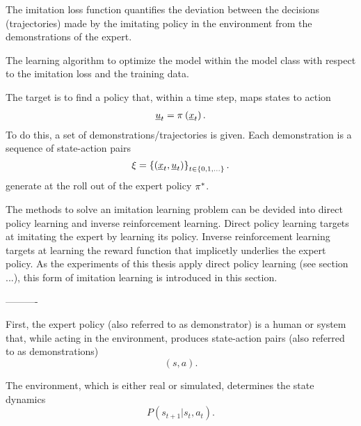 The imitation loss function quantifies 
the deviation between the decisions (trajectories)
made by the imitating policy in the environment
from the demonstrations of the expert.

The learning algorithm to optimize the 
model within the model class with respect to
the imitation loss and the training data.



The target is to find a policy that, within a time step,
maps states to action
\begin{align}
    \underline{u}_{t} = \pi^{}_{} \left({ 
        \underline{x}_{t} 
    }\right).
\end{align}
To do this, a set of demonstrations/trajectories is given.
Each demonstration is a sequence of state-action pairs
\begin{equation}
    \xi = \left\{{
        \left({\underline{x}_{t},\underline{u}_{t}}\right)
    }\right\}_{t \in \left\{{0, 1, \dots}\right\}}
    .
\end{equation}
generate at the roll out of the expert policy $\pi^{*}_{}$.



The methods to solve an imitation learning problem can be devided into 
direct policy learning and inverse reinforcement learning.
Direct policy learning targets at imitating the expert by learning its policy.
Inverse reinforcement learning targets at learning the reward function
that implicetly underlies the expert policy.
As the experiments of this thesis apply direct policy learning 
(see section ...),
this form of imitation learning is introduced in this section.


----------



First, the expert policy (also referred to as demonstrator) is a human or system
that, while acting in the environment,
produces state-action pairs (also referred to as demonstrations)
\begin{equation}
    \left(s, a\right).
\end{equation}


The environment, which is either real or simulated, 
determines the state dynamics
\begin{equation}
    P(s_{t+1}|s_{t},a_t).
\end{equation}

